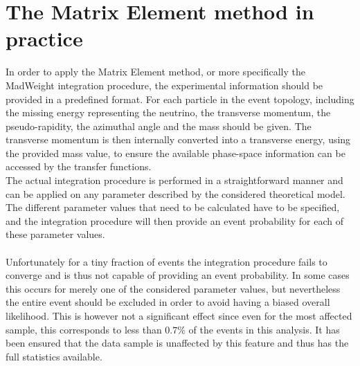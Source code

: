 \section{The Matrix Element method in practice} \label{sec::MEMExample}   %

In order to apply the Matrix Element method, or more specifically the MadWeight integration procedure, the experimental information should be provided in a predefined format. For each particle in the event topology, including the missing energy representing the neutrino, the transverse momentum, the pseudo-rapidity, the azimuthal angle and the mass should be given.
The transverse momentum is then internally converted into a transverse energy, using the provided mass value, to ensure the available phase-space information can be accessed by the transfer functions.
\\
The actual integration procedure is performed in a straightforward manner and can be applied on any parameter described by the considered theoretical model. 
The different parameter values that need to be calculated have to be specified, and the integration procedure will then provide an event probability for each of these parameter values.
\\
\\
Unfortunately for a tiny fraction of events the integration procedure fails to converge and is thus not capable of providing an event probability. 
In some cases this occurs for merely one of the considered parameter values, but nevertheless the entire event should be excluded in order to avoid having a biased overall likelihood.
This is however not a significant effect since even for the most affected sample, this corresponds to less than $0.7\%$ of the events in this analysis.
It has been ensured that the data sample is unaffected by this feature and thus has the full statistics available.
\\

